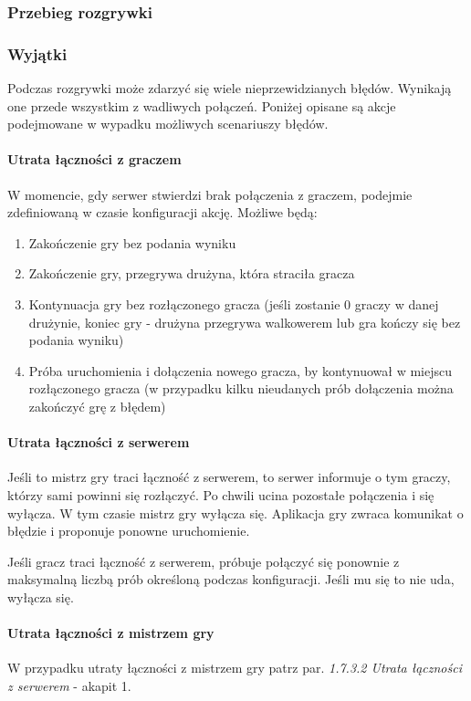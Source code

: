 \documentclass[11pt]{article}
\let\Oldsubsubsection\subsubsection
\renewcommand{\subsubsection}{\FloatBarrier\Oldsubsubsection}
\begin{document}
\subsubsection{Przebieg rozgrywki}

\subsubsection{Wyjątki}
\par
Podczas rozgrywki może zdarzyć się wiele nieprzewidzianych błędów. Wynikają one przede wszystkim z wadliwych połączeń. Poniżej opisane są akcje podejmowane w wypadku możliwych scenariuszy błędów.

\paragraph{Utrata łączności z graczem}
\par
W momencie, gdy serwer stwierdzi brak połączenia z graczem, podejmie zdefiniowaną w czasie konfiguracji akcję. Możliwe będą:
\begin{enumerate}
\item Zakończenie gry bez podania wyniku
\item Zakończenie gry, przegrywa drużyna, która straciła gracza
\item Kontynuacja gry bez rozłączonego gracza (jeśli zostanie 0 graczy w danej drużynie, koniec gry - drużyna przegrywa walkowerem lub gra kończy się bez podania wyniku)
\item Próba uruchomienia i dołączenia nowego gracza, by kontynuował w miejscu rozłączonego gracza (w przypadku kilku nieudanych prób dołączenia można zakończyć grę z błędem)
\end{enumerate}

\paragraph{Utrata łączności z serwerem}
\par
Jeśli to mistrz gry traci łączność z serwerem, to serwer informuje o tym graczy, którzy sami powinni się rozłączyć. Po chwili ucina pozostałe połączenia i się wyłącza. W tym czasie mistrz gry wyłącza się. Aplikacja gry zwraca komunikat o błędzie i proponuje ponowne uruchomienie.
\par
Jeśli gracz traci łączność z serwerem, próbuje połączyć się ponownie z maksymalną liczbą prób określoną podczas konfiguracji. Jeśli mu się to nie uda, wyłącza się.

\paragraph{Utrata łączności z mistrzem gry}
\par
W przypadku utraty łączności z mistrzem gry patrz par. \textit{1.7.3.2 Utrata łączności z serwerem} - akapit 1.
\end{document}
